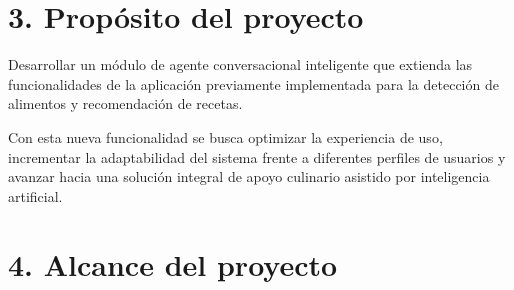 \documentclass[
11pt, %
]{charter}
\begin{document}
\section{3. Propósito del proyecto}
\label{sec:proposito}

Desarrollar un módulo de agente conversacional inteligente que extienda las funcionalidades de la aplicación previamente implementada para la detección de alimentos y recomendación de recetas. 

Con esta nueva funcionalidad se busca optimizar la experiencia de uso, incrementar la adaptabilidad del sistema frente a diferentes perfiles de usuarios y avanzar hacia una solución integral de apoyo culinario asistido por inteligencia artificial.

\section{4. Alcance del proyecto}
\label{sec:alcance}
\end{document}
